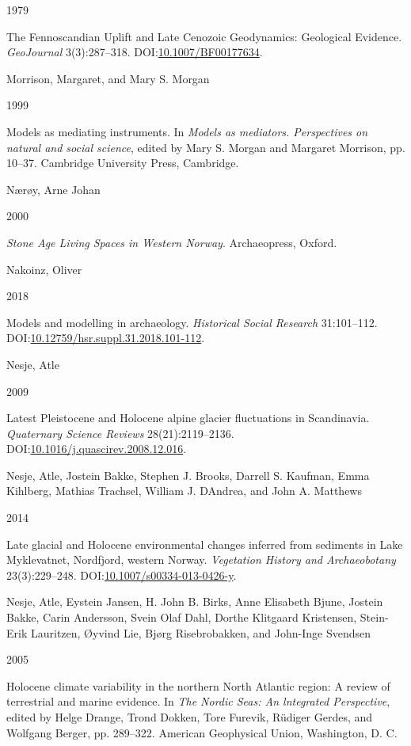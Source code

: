 \documentclass[
  12pt,
  a4paper,
  oneside]{book}
\newlength{\cslhangindent}
\newlength{\csllabelwidth}
\newlength{\cslentryspacingunit} %
\newenvironment{CSLReferences}[2] %
 {%
  \setlength{\parindent}{0pt}
  \ifodd #1
  \let\oldpar\par
  \def\par{\hangindent=\cslhangindent\oldpar}
  \fi
  \setlength{\parskip}{#2\cslentryspacingunit}
 }%
 {}
\newcommand{\CSLBlock}[1]{#1\hfill\break}
\newcommand{\CSLLeftMargin}[1]{\parbox[t]{\csllabelwidth}{#1}}
\newcommand{\CSLRightInline}[1]{\parbox[t]{\linewidth - \csllabelwidth}{#1}\break}
\begin{document}
\begin{CSLReferences}{0}{0}
\leavevmode{}%
\CSLLeftMargin{ 1979 }%
\CSLRightInline{{The Fennoscandian Uplift and Late Cenozoic Geodynamics: Geological Evidence}. \emph{GeoJournal} 3(3):287--318. DOI:\href{https://doi.org/10.1007/BF00177634}{10.1007/BF00177634}.}

\leavevmode{}%
\CSLBlock{Morrison, Margaret, and Mary S. Morgan}
\CSLLeftMargin{ 1999}%
\CSLRightInline{Models as mediating instruments. In \emph{Models as mediators. Perspectives on natural and social science}, edited by Mary S. Morgan and Margaret Morrison, pp. 10--37. Cambridge University Press, Cambridge.}

\leavevmode{}%
\CSLBlock{Nærøy, Arne Johan}
\CSLLeftMargin{ 2000}%
\CSLRightInline{\emph{{Stone Age Living Spaces in Western Norway}}. Archaeopress, Oxford.}

\leavevmode{}%
\CSLBlock{Nakoinz, Oliver}
\CSLLeftMargin{ 2018}%
\CSLRightInline{Models and modelling in archaeology. \emph{Historical Social Research} 31:101--112. DOI:\href{https://doi.org/10.12759/hsr.suppl.31.2018.101-112}{10.12759/hsr.suppl.31.2018.101-112}.}

\leavevmode{}%
\CSLBlock{Nesje, Atle}
\CSLLeftMargin{ 2009}%
\CSLRightInline{Latest Pleistocene and Holocene alpine glacier fluctuations in Scandinavia. \emph{Quaternary Science Reviews} 28(21):2119--2136. DOI:\href{https://doi.org/10.1016/j.quascirev.2008.12.016}{10.1016/j.quascirev.2008.12.016}.}

\leavevmode{}%
\CSLBlock{Nesje, Atle, Jostein Bakke, Stephen J. Brooks, Darrell S. Kaufman, Emma Kihlberg, Mathias Trachsel, William J. DAndrea, and John A. Matthews}
\CSLLeftMargin{ 2014}%
\CSLRightInline{Late glacial and Holocene environmental changes inferred from sediments in Lake Myklevatnet, Nordfjord, western Norway. \emph{Vegetation History and Archaeobotany} 23(3):229--248. DOI:\href{https://doi.org/10.1007/s00334-013-0426-y}{10.1007/s00334-013-0426-y}.}

\leavevmode{}%
\CSLBlock{Nesje, Atle, Eystein Jansen, H. John B. Birks, Anne Elisabeth Bjune, Jostein Bakke, Carin Andersson, Svein Olaf Dahl, Dorthe Klitgaard Kristensen, Stein-Erik Lauritzen, Øyvind Lie, Bjørg Risebrobakken, and John-Inge Svendsen}
\CSLLeftMargin{ 2005}%
\CSLRightInline{{Holocene climate variability in the northern North Atlantic region: A review of terrestrial and marine evidence}. In \emph{{The Nordic Seas: An lntegrated Perspective}}, edited by Helge Drange, Trond Dokken, Tore Furevik, Rüdiger Gerdes, and Wolfgang Berger, pp. 289--322. American Geophysical Union, Washington, D. C.}


\end{CSLReferences}
\end{document}
